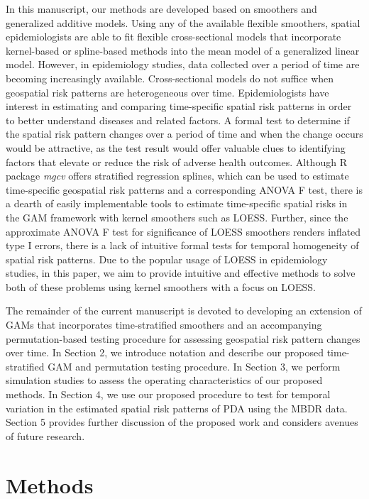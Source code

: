 	In this manuscript, our methods are developed based on smoothers and generalized additive models. Using any of the available flexible smoothers, spatial epidemiologists are able to fit flexible cross-sectional models that incorporate kernel-based or spline-based methods into the mean model of a generalized linear model. However, in epidemiology studies, data collected over a period of time are becoming increasingly available. Cross-sectional models do not suffice when geospatial risk patterns are heterogeneous over time. Epidemiologists have interest in estimating and comparing time-specific spatial risk patterns in order to better understand diseases and related factors. A formal test to determine if the spatial risk pattern changes over a period of time and when the change occurs would be attractive, as the test result would offer valuable clues to identifying factors that elevate or reduce the risk of adverse health outcomes. Although R package \emph{mgcv}  \citep{wood2017generalized,wood2003thin,wood2011fast,wood2016smoothing,wood2004Stable} offers stratified regression splines, which can be used to estimate time-specific geospatial risk patterns and a corresponding ANOVA F test, there is a dearth of easily implementable tools to estimate time-specific spatial risks in the GAM framework with kernel smoothers such as LOESS. Further, since the approximate ANOVA F test for significance of LOESS smoothers renders inflated type I errors, \citep{young2011generalized} there is a lack of intuitive formal tests for temporal homogeneity of spatial risk patterns. Due to the popular usage of LOESS in epidemiology studies, in this paper, we aim to provide intuitive and effective methods to solve both of these problems using kernel smoothers with a focus on LOESS.
	
	The remainder of the current manuscript is devoted to developing an extension of GAMs that incorporates time-stratified smoothers and an accompanying permutation-based testing procedure for assessing geospatial risk pattern changes over time. In Section 2, we introduce notation and describe our proposed time-stratified GAM and permutation testing procedure. In Section 3, we perform simulation studies to assess the operating characteristics of our proposed methods. In Section 4, we use our proposed procedure to test for temporal variation in the estimated spatial risk patterns of PDA using the MBDR data. Section 5 provides further discussion of the proposed work and considers avenues of future research.
	
	\section{Methods}
	
